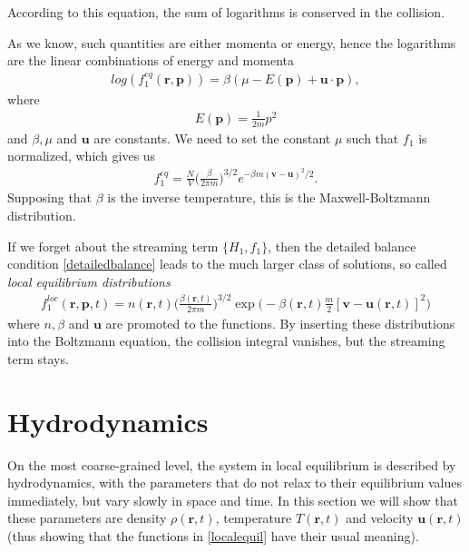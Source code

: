 According to this equation, the sum of logarithms is conserved in the collision.

As we know, such quantities are either momenta or energy, hence the logarithms are the linear combinations of energy and momenta
\begin{align*}
log(f_1^{eq}(\bm{r},\bm{p})) = \beta(\mu - E(\bm{p}) + \bm{u} \cdot \bm{p}),
\end{align*}
where
\begin{align*}
E(\bm{p}) = \frac{1}{2m} p^2
\end{align*}
and $\beta,\mu$ and $\bm{u}$ are constants.
We need to set the constant $\mu$ such that $f_1$ is normalized, which gives us
\begin{align} \label{mbt}
f_1^{eq} = \frac{N}{V}\big(\frac{\beta}{2\pi m}\big)^{3/2} e^{-\beta m (\bm{v} - \bm{u})^2/2}.
\end{align}
Supposing that $\beta$ is the inverse temperature, this is the Maxwell-Boltzmann distribution.

If we forget about the streaming term $\big\{ H_1, f_1 \big\}$, then the detailed balance condition \ref{detailedbalance} leads to the much larger class of solutions, so called \textit{local equilibrium distributions}
\begin{align} \label{localequil}
f_1^{loc}(\bm{r},\bm{p},t) = n(\bm{r},t) \Big(\frac{\beta(\bm{r},t)}{2\pi m}\Big)^{3/2} \exp \big(-\beta(\bm{r},t)\frac{m}{2}[\bm{v} - \bm{u}(\bm{r},t)]^2 \big)
\end{align}
where $n,\beta$ and $\bm{u}$ are promoted to the functions.
By inserting these distributions into the Boltzmann equation, the collision integral vanishes, but the streaming term stays.

\section{Hydrodynamics}
On the most coarse-grained level, the system in local equilibrium is described by hydrodynamics, with the parameters that do not relax to their equilibrium values immediately, but vary slowly in space and time.
In this section we will show that these parameters are density $\rho(\bm{r},t)$, temperature $T(\bm{r},t)$ and velocity $\bm{u}(\bm{r},t)$ (thus showing that the functions in \ref{localequil} have their usual meaning).

